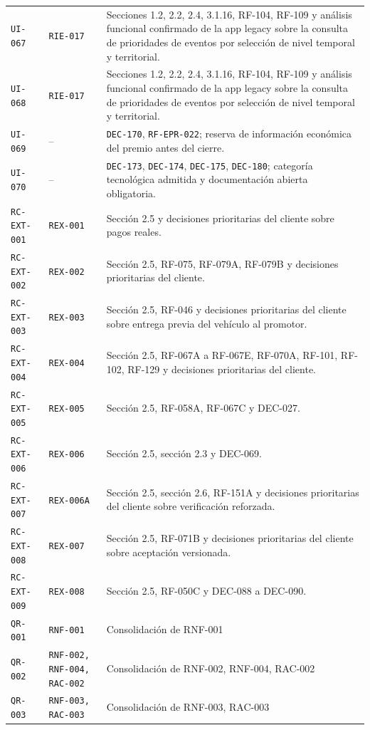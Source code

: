 \documentclass[10pt,letterpaper]{article}
\begin{document}
\begin{landscape}
\begin{longtable}{P{2.7cm}P{2.6cm}P{15.7cm}}
\texttt{UI-067} & \texttt{RIE-017} & Secciones 1.2, 2.2, 2.4, 3.1.16, RF-104, RF-109 y análisis funcional confirmado de la app legacy sobre la consulta de prioridades de eventos por selección de nivel temporal y territorial.\\
\texttt{UI-068} & \texttt{RIE-017} & Secciones 1.2, 2.2, 2.4, 3.1.16, RF-104, RF-109 y análisis funcional confirmado de la app legacy sobre la consulta de prioridades de eventos por selección de nivel temporal y territorial.\\
\texttt{UI-069} & -- & \texttt{DEC-170}, \texttt{RF-EPR-022}; reserva de información económica del premio antes del cierre.\\
\texttt{UI-070} & -- & \texttt{DEC-173}, \texttt{DEC-174}, \texttt{DEC-175}, \texttt{DEC-180}; categoría tecnológica admitida y documentación abierta obligatoria.\\
\texttt{RC-EXT-001} & \texttt{REX-001} & Sección 2.5 y decisiones prioritarias del cliente sobre pagos reales.\\
\texttt{RC-EXT-002} & \texttt{REX-002} & Sección 2.5, RF-075, RF-079A, RF-079B y decisiones prioritarias del cliente.\\
\texttt{RC-EXT-003} & \texttt{REX-003} & Sección 2.5, RF-046 y decisiones prioritarias del cliente sobre entrega previa del vehículo al promotor.\\
\texttt{RC-EXT-004} & \texttt{REX-004} & Sección 2.5, RF-067A a RF-067E, RF-070A, RF-101, RF-102, RF-129 y decisiones prioritarias del cliente.\\
\texttt{RC-EXT-005} & \texttt{REX-005} & Sección 2.5, RF-058A, RF-067C y DEC-027.\\
\texttt{RC-EXT-006} & \texttt{REX-006} & Sección 2.5, sección 2.3 y DEC-069.\\
\texttt{RC-EXT-007} & \texttt{REX-006A} & Sección 2.5, sección 2.6, RF-151A y decisiones prioritarias del cliente sobre verificación reforzada.\\
\texttt{RC-EXT-008} & \texttt{REX-007} & Sección 2.5, RF-071B y decisiones prioritarias del cliente sobre aceptación versionada.\\
\texttt{RC-EXT-009} & \texttt{REX-008} & Sección 2.5, RF-050C y DEC-088 a DEC-090.\\
\texttt{QR-001} & \texttt{RNF-001} & Consolidación de RNF-001\\
\texttt{QR-002} & \texttt{RNF-002, RNF-004, RAC-002} & Consolidación de RNF-002, RNF-004, RAC-002\\
\texttt{QR-003} & \texttt{RNF-003, RAC-003} & Consolidación de RNF-003, RAC-003\\

\end{longtable}
\end{landscape}
\end{document}
